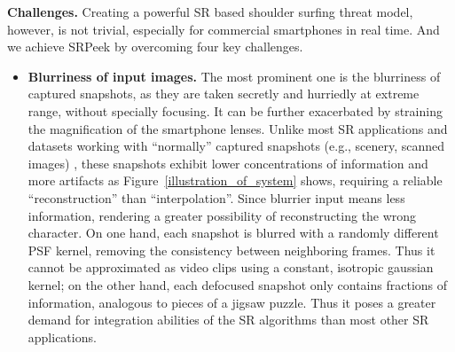 \vspace{1mm}
\noindent
\textbf{Challenges.} Creating a powerful SR based shoulder surfing threat model, however, is not trivial, especially for commercial smartphones in real time. And we achieve \textsf{SRPeek} by overcoming four key challenges.

\begin{itemize}[leftmargin=*]
  \item \textbf{Blurriness of input images.} The most prominent one is the blurriness of captured snapshots, as they are taken secretly and hurriedly at extreme range, without specially focusing. It can be further exacerbated by straining the magnification of the smartphone lenses. Unlike most SR applications and datasets working with ``normally'' captured snapshots (e.g., scenery, scanned images) \cite{nasrollahi2020deep,lyn2020image}, these snapshots exhibit lower concentrations of information and more artifacts as Figure~\ref{illustration_of_system} shows, requiring a reliable ``reconstruction'' than ``interpolation''. Since blurrier input means less information, rendering a greater possibility of reconstructing the wrong character. 
  On one hand, each snapshot is blurred with a randomly different PSF kernel, removing the consistency between neighboring frames. Thus it cannot be approximated as video clips using a constant, isotropic gaussian kernel; on the other hand, each defocused snapshot only contains fractions of information, analogous to pieces of a jigsaw puzzle. Thus it poses a greater demand for integration abilities of the SR algorithms than most other SR applications.

\end{itemize}
